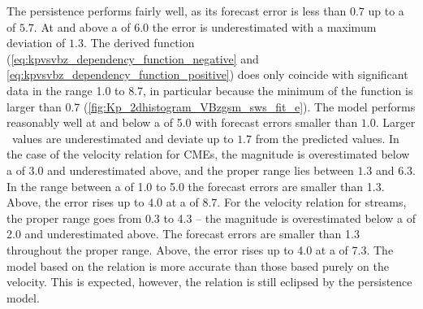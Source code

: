 The persistence performs fairly well, as its forecast error is less than $0.7$ up to a \Kp{} of $5.7$. At and above a \Kp{} of $6.0$ the error is underestimated with a maximum deviation of $1.3$.
The derived \vBz{} function (\ref{eq:kpvsvbz_dependency_function_negative} and \ref{eq:kpvsvbz_dependency_function_positive}) does only coincide with significant data in the \Kp{} range 1.0 to 8.7, in particular because the minimum of the \vBz{} function is larger than 0.7 (\autoref{fig:Kp_2dhistogram_VBzgsm_sws_fit_e}). The model performs reasonably well at and below a \Kp{} of 5.0 with forecast errors smaller than $1.0$. Larger \Kp~values are underestimated and deviate up to $1.7$ from the predicted values.
In the case of the velocity relation for CMEs, the \Kp{} magnitude is overestimated below a \Kp{} of 3.0 and underestimated above, and the proper range lies between $1.3$ and $6.3$. In the range between a \Kp{} of 1.0 to 5.0 the forecast errors are smaller than 1.3. Above, the error rises up to $4.0$ at a \Kp{} of $8.7$.
For the velocity relation for streams, the proper range goes from 0.3 to 4.3 -- the magnitude is overestimated below a \Kp{} of 2.0 and underestimated above. The forecast errors are smaller than 1.3 throughout the proper range. Above, the error rises up to 4.0 at a \Kp{} of 7.3.
The model based on the \vBz{} relation is more accurate than those based purely on the velocity. This is expected, however, the \vBz{} relation is still eclipsed by the persistence model.

